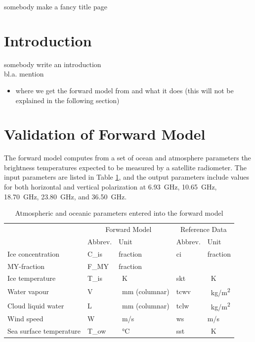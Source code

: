 \documentclass[11pt, a4paper]{article}
\begin{document}
\begin{titlepage}
\centering
{somebody make a fancy title page}
\end{titlepage}







\section*{Introduction}

somebody write an introduction \\

bl.a. mention
\begin{itemize}
\item where we get the forward model from and what it does (this will not be explained in the following section)
\end{itemize}






\newpage
\section{Validation of Forward Model}

The forward model computes from a set of ocean and atmosphere parameters the brightness temperatures expected to be measured by a satellite radiometer. The input parameters are listed in Table \ref{tab:input_parameters}, and the output parameters include values for both horizontal and vertical polarization at \SI{6.93}{GHz}, \SI{10.65}{GHz}, \SI{18.70}{GHz}, \SI{23.80}{GHz}, and \SI{36.50}{GHz}.

\begin{table}[h!]
\centering
\begin{tabular}{@{}p{4cm} p{1.8cm}p{2.8cm}p{1.8cm}p{1.8cm}@{}}
\tabularnewline
& \multicolumn{2}{c}{Forward Model} & \multicolumn{2}{c}{Reference Data}
\tabularnewline
\cmidrule(r{1em}){2-3} \cmidrule(l{1em}){4-5}
& Abbrev. & Unit & Abbrev. & Unit
\tabularnewline
\midrule
Ice concentration	& C\_is	& fraction		& ci	& fraction	\\
MY-fraction		& F\_MY	& fraction		& 	& 		\\
Ice temperature		& T\_is	& \SI{}{K}	& skt	& \SI{}{K}	\\
Water vapour		& V	& \SI{}{mm} (columnar)	& tcwv	& \SI{}{kg/m^2}	\\
Cloud liquid water	& L	& \SI{}{mm} (columnar)	& tclw	& \SI{}{kg/m^2}	\\
Wind speed		& W	& \SI{}{m/s}		& ws	& m/s		\\
Sea surface temperature	& T\_ow	& \SI{}{\degreeCelsius}	& sst	& \SI{}{K}	\\
\midrule
\end{tabular}
\caption{Atmospheric and oceanic parameters entered into the forward model}
\label{tab:input_parameters}
\end{table}
\end{document}
